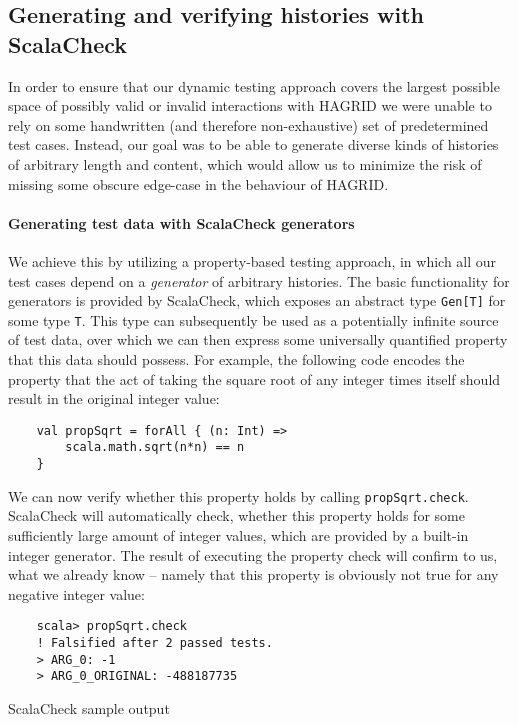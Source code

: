 \subsection{Generating and verifying histories with ScalaCheck}
\label{sec:test_approach}
In order to ensure that our dynamic testing approach covers the largest possible space of possibly valid or invalid interactions with HAGRID we were unable to rely on some handwritten (and therefore non-exhaustive) set of predetermined test cases. Instead, our goal was to be able to generate diverse kinds of histories of arbitrary length and content, which would allow us to minimize the risk of missing some obscure edge-case in the behaviour of HAGRID.

\paragraph{Generating test data with ScalaCheck generators}
We achieve this by utilizing a property-based testing approach, in which all our test cases depend on a \emph{generator} of arbitrary histories. The basic functionality for generators is provided by ScalaCheck, which exposes an abstract type \texttt{Gen[T]} for some type \texttt{T}. This type can subsequently be used as a potentially infinite source of test data, over which we can then express some universally quantified property that this data should possess.
For example, the following code encodes the property that the act of taking the square root of any integer times itself should result in the original integer value: 
\begin{verbatim}
    val propSqrt = forAll { (n: Int) => 
        scala.math.sqrt(n*n) == n 
    }
\end{verbatim}

We can now verify whether this property holds by calling \texttt{propSqrt.check}. 
ScalaCheck will automatically check, whether this property holds for some sufficiently large amount of integer values, which are provided by a built-in integer generator. The result of executing the property check will confirm to us, what we already know -- namely that this property is obviously not true for any negative integer value: 
\begin{code}
    \begin{verbatim}
    scala> propSqrt.check
    ! Falsified after 2 passed tests.
    > ARG_0: -1
    > ARG_0_ORIGINAL: -488187735
    \end{verbatim} 
    \caption{ScalaCheck sample output}
\end{code}

